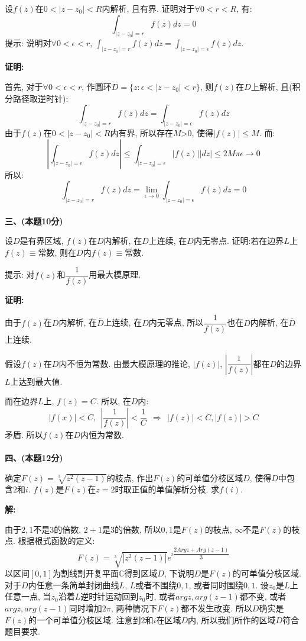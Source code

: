 \documentclass{article}
\begin{document}
设$f(z)$在$0<|z-z_0|<R$内解析, 且有界. 证明对于$\forall 0<r<R$, 有:
$$  \int_{|z-z_0|=r} f(z) dz = 0 $$
提示: 说明对$\forall 0< \epsilon < r$, $\int_{|z-z_0|=r} f(z) dz = \int_{|z-z_0|=\epsilon} f(z)dz$. 

\textbf{证明:}  

首先, 对于$\forall 0<\epsilon<r$, 作圆环$D = \{z: \epsilon<|z-z_0|<r  \}$, 则$f(z)$在$D$上解析, 且(积分路径取逆时针):
$$ \int_{|z-z_0|=r} f(z) dz = \int_{|z-z_0|=\epsilon} f(z) dz  $$
由于$f(z)$在$0<|z-z_0|<R$内有界, 所以存在$M$>0, 使得$|f(z)| \leq M$. 而:
$$ \left| \int_{|z-z_0|=\epsilon} f(z) dz \right| \leq \int_{|z-z_0|=\epsilon} \left| f(z) \right| \left| dz \right| \leq 2M\pi \epsilon \rightarrow 0  $$
所以:
$$  \int_{|z-z_0|=r} f(z) dz =  \lim\limits_{\epsilon \rightarrow 0} \int_{|z-z_0|=\epsilon} f(z) dz = 0  $$ \\  

\textbf{三、(本题10分)}

设$D$是有界区域, $f(z)$在$D$内解析, 在$\overline{D}$上连续, 在$D$内无零点. 证明:若在边界$L$上$f(z) \equiv $常数, 则在$D$内$f(z) \equiv $常数. 

提示: 对$f(z)$和$\dfrac{1}{f(z)}$用最大模原理. 

\textbf{证明:} 

由于$f(z)$在$D$内解析, 在$\overline{D}$上连续, 在$D$内无零点, 所以$\dfrac{1}{f(z)}$也在$D$内解析, 在$\overline{D}$上连续.

假设$f(z)$在$D$内不恒为常数. 由最大模原理的推论, $|f(z)|$, $\left|\dfrac{1}{f(z)}\right|$都在$D$的边界$L$上达到最大值.

而在边界$L$上, $f(z) = C$. 所以, 在$D$内:
$$ |f(x)| < C, \ \ \left| \dfrac{1}{f(z)} \right| < \dfrac{1}{C} \ \ \Rightarrow \ \ |f(z)|<C, |f(z)|>C  $$
矛盾. 所以$f(z)$在$D$内恒为常数. \\  \\


\textbf{四、(本题12分)}

确定$F(z) = \sqrt[3]{z^2(z-1)}$的枝点, 作出$F(z)$的可单值分枝区域$D$, 使得$D$中包含$2$和$i$. $f(z)$是$F(z)$在$z=2$时取正值的单值解析分枝. 求$f(i)$. 

\textbf{解:} 

由于$2,1$不是$3$的倍数, $2+1$是$3$的倍数, 所以$0,1$是$F(z)$的枝点, $\infty$不是$F(z)$的枝点. 根据根式函数的定义:
$$ F(z) = \sqrt[3]{|z^2(z-1)|} e^{i\dfrac{2Argz + Arg(z-1)}{3}} $$
以区间$[0,1]$为割线割开复平面$\mathbb{C}$得到区域$D$, 下说明$D$是$F(z)$的可单值分枝区域. 对于$D$内任意一条简单封闭曲线$L$, $L$或者不围绕$0,1$, 或者同时围绕$0,1$. 设$z_0$是$L$上任意一点, 当$z_0$沿着$L$逆时针运动回到$z_0$时, 或者$argz, arg(z-1)$都不变, 或者$argz, arg(z-1)$同时增加$2\pi$, 两种情况下$F(z)$都不发生改变. 所以$D$确实是$F(z)$的一个可单值分枝区域. 注意到$2$和$i$在区域$D$内, 所以我们所作的区域$D$符合题目要求.
\end{document}
